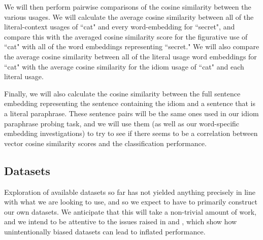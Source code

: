 \documentclass[11pt,a4paper]{article}
\begin{document}
 We will then perform pairwise comparisons of the cosine similarity between the various usages. We will calculate the average cosine similarity between all of the literal-context usages of ``cat" and every word-embedding for ``secret", and compare this with the averaged cosine similarity score for the figurative use of ``cat" with all of the  word embeddings representing ``secret." We will also compare the average cosine similarity between all of the literal usage word embeddings for ``cat" with the average cosine similarity for the idiom usage of ``cat" and each literal usage.
 
 Finally, we will also calculate the cosine similarity between the full sentence embedding representing the sentence containing the idiom and a sentence that is a literal paraphrase. These sentence pairs will be the same ones used in our idiom paraphrase probing task, and we will use them (as well as our word-specific embedding investigations) to try to see if there seems to be a correlation between vector cosine similarity scores and the classification performance.
\subsection{Datasets}
Exploration of available datasets so far has not yielded anything precisely in line with what we are looking to use, and so we expect to have to primarily construct our own datasets. We anticipate that this will take a non-trivial amount of work, and we intend to be attentive to the issues raised in \citet{niven2019probing} and \citet{mccoy2019right}, which show how unintentionally biased datasets can lead to inflated performance.
\end{document}
